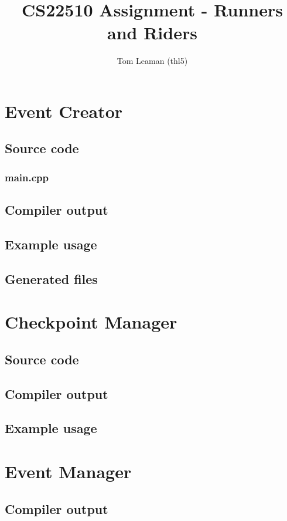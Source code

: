 \documentclass[a4paper, twoside]{article}
\title{CS22510 Assignment - Runners and Riders}
\author{Tom Leaman (thl5)}
\begin{document}
\maketitle
\newpage
\tableofcontents
\newpage

\section{Event Creator}
\subsection{Source code}
\subsubsection{main.cpp}

\subsection{Compiler output}
\subsection{Example usage}
\subsection{Generated files}

\section{Checkpoint Manager}
\subsection{Source code}
\subsection{Compiler output}
\subsection{Example usage}

\section{Event Manager}
\subsection{Compiler output}
\end{document}
